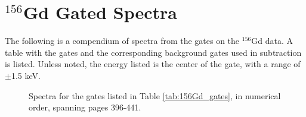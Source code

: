 \chapter{$^{156}$Gd Gated Spectra}
\label{chap:156_spectra}

The following is a compendium of spectra from the gates on the $^{156}$Gd data. A table with the gates and the corresponding background gates used in subtraction is listed. Unless noted, the energy listed is the center of the gate, with a range of $\pm$1.5 keV.



\pagebreak

\begin{figure}
    \caption{Spectra for the gates listed in Table \ref{tab:156Gd_gates}, in numerical order, spanning pages 396-441.}
    \label{fig:156_App}
\end{figure}

\pagebreak

